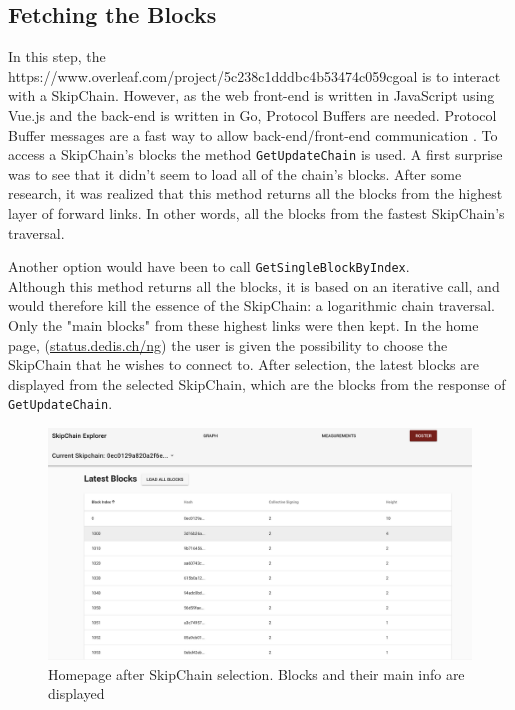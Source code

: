 \documentclass[11pt, a4paper, twoside, openright]{article} %
\begin{document}
{\subsection{Fetching the Blocks}
In this step, the https://www.overleaf.com/project/5c238c1dddbc4b53474c059cgoal is to interact with a SkipChain. However, as the web front-end is written in JavaScript using Vue.js and the back-end is written in Go, Protocol Buffers are needed.
Protocol Buffer messages are a fast way to allow back-end/front-end communication \cite{protobuf}.
To access a SkipChain's blocks the method \verb|GetUpdateChain| is used. A first surprise was to see that it didn't seem to load all of the chain's blocks. After some research, it was realized that this method returns all the blocks from the highest layer of forward links. In other words, all the blocks from the fastest SkipChain's traversal. 

Another option would have been to call \verb|GetSingleBlockByIndex|.
\\
Although this method returns all the blocks, it is based on an iterative call, and would therefore kill the essence of the SkipChain: a logarithmic chain traversal. Only the "main blocks" from these highest links were then kept.
In the home page, (\href{http://status.dedis.ch/ng/}{status.dedis.ch/ng}) the user is given the possibility to choose the SkipChain that he wishes to connect to. After selection, the latest blocks are displayed from the selected SkipChain, which are the blocks from the response of \verb|GetUpdateChain|.
\newline
\begin{figure}[h]
    \centering
    \includegraphics[width=\textwidth]{LatestBlocks}
    \caption{Homepage after SkipChain selection. Blocks and their main info are displayed}
    \label{fig:my_label}
\end{figure}
\clearpage
}
\end{document}
